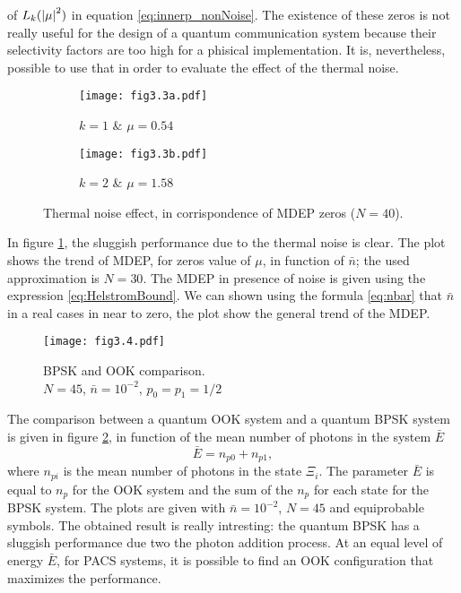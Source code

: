     of $L_k(\absolutevalue{\mu}^2)$ in equation \ref{eq:innerp_nonNoise}.
    The existence of these zeros is not really useful for the design of a quantum communication
    system because their selectivity factors are too high for a phisical implementation. It is, 
    nevertheless, possible to use that in order to evaluate the effect of the thermal noise.
    \begin{figure}[tbp]
        \begin{subfigure}{0.5\textwidth}
            \texttt{[image: fig3.3a.pdf]}
            \caption{$k=1$ \& $\mu = 0.54$}
        \end{subfigure}
        \begin{subfigure}{0.5\textwidth}
            \texttt{[image: fig3.3b.pdf]}
            \caption{$k=2$ \& $\mu = 1.58$}
        \end{subfigure}
        \caption{Thermal noise effect, in corrispondence of MDEP zeros ($N=40$).}
        \label{fig:3.3}
    \end{figure}
    In figure \ref{fig:3.3}, the sluggish performance due to the thermal noise is clear. The plot
    shows the trend of MDEP, for zeros value of $\mu$, in function of $\bar{n}$; the used approximation
    is $N=30$. The MDEP in presence of noise is given using the expression \ref{eq:HelstromBound}.
    We can shown using the formula \ref{eq:nbar} that $\bar{n}$ in a real cases in near to zero, the 
    plot show the general trend of the MDEP.

    \begin{figure}[tbp]
        \texttt{[image: fig3.4.pdf]}
        \caption{BPSK and OOK comparison. \\$N=45$, $\bar{n}=10^{-2}$, $p_0=p_1=1/2$}
        \label{fig:3.4}
    \end{figure}
    The comparison between a quantum OOK system and a quantum BPSK system is given in figure 
    \ref{fig:3.4}, in function of the mean number of photons in the system $\bar{E}$
    \begin{equation*}
        \bar{E}=n_{p0}+n_{p1},
    \end{equation*}
    where $n_{pi}$ is the mean number of photons in the state $\Xi_i$.
    The parameter $\bar{E}$ is equal to $n_p$ for the OOK system and the sum of the $n_p$ for 
    each state for the BPSK system.
    The plots are given with $\bar{n}= 10^{-2}$, $N=45$ and equiprobable symbols.
    The obtained result is really intresting: the quantum BPSK has a sluggish performance due two 
    the photon addition process. At an equal level of energy $\bar{E}$, for PACS systems, it is
    possible to find an OOK configuration that maximizes the performance.
    